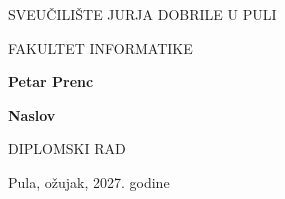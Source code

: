\begin{center}
SVEUČILIŠTE JURJA DOBRILE U PULI 

FAKULTET INFORMATIKE

\vspace{45mm} 

\textbf{Petar Prenc}

\vspace{20mm} 

\textbf{Naslov}

\vspace{5mm}
DIPLOMSKI RAD

\vfill

Pula, ožujak, 2027. godine
\end{center}
